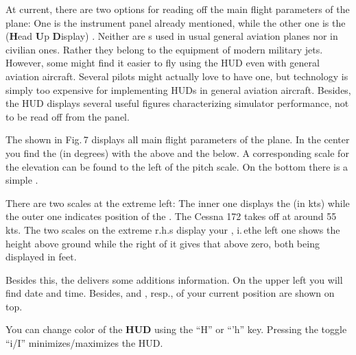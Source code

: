 At current, there are two options for reading off the main flight parameters of
the
plane: One is the instrument panel already mentioned, while the other one is the
 (\textbf{H}ead \textbf{U}p \textbf{D}isplay) . Neither
are s used in usual general aviation planes nor in civilian ones.
Rather they
belong to the equipment of modern military jets. However, some might find it
easier to
fly using the HUD even with general aviation aircraft. Several 
pilots
might actually love to have one, but technology is simply too expensive for
implementing
HUDs in general aviation aircraft. Besides, the HUD displays several useful
figures
characterizing simulator performance, not to be read off from the panel.

The  shown in Fig.\,7  displays all main flight parameters of the
plane. In
the center you find the  (in degrees) with the
 above and the  below. A corresponding scale
for the
elevation can be found to the left of the pitch
scale. On the
bottom there is a simple .

There are two scales at the extreme left: The inner one displays the
 (in
kts) while the outer one indicates position of the . The Cessna
172 takes
off at around 55 kts. The two scales on the extreme r.h.s display your
,
i.\,e\. the left one shows the height above ground while the right of it gives
that above
zero, both being displayed in feet.

Besides this, the  delivers some additions information. On the upper
left you
will find date and time. Besides,   and ,
resp., of your current position are shown on top.

You can change color of the \textbf{HUD} using the ``H'' or ``'h''  key.
Pressing the toggle ``i/I'' minimizes/maximizes the HUD.

\medskip

 \centerline{}

